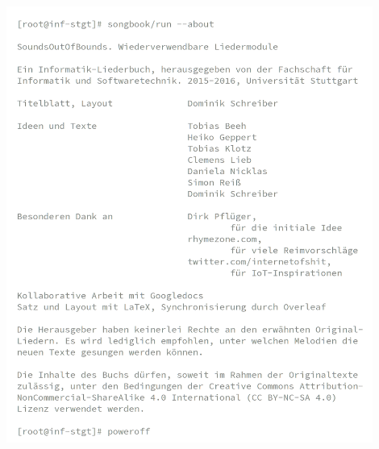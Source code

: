 \documentclass[11pt,a5paper]{article}
\begin{document}
\pagebreak

\ 
\thispagestyle{empty}

\pagebreak

\vspace*{3.5cm}

\hfill\includegraphics[width=12cm]{hacker-cover-hinten-zugeschnitten.png}\hspace*{\fill}

\thispagestyle{empty}




\end{document}
